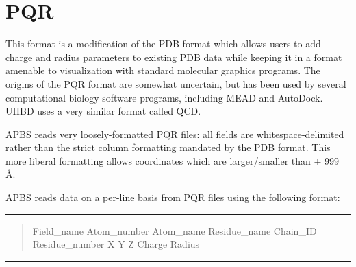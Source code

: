 \documentclass[letterpaper,10pt,english]{sphinxmanual}
\begin{document}
\section{PQR}
\label{documentation_pages/file_format:pqr}
This format is a modification of the PDB format which allows users to add charge
and radius parameters to existing PDB data while keeping it in a format amenable
to visualization with standard molecular graphics programs. The origins of the PQR
format are somewhat uncertain, but has been used by several computational biology
software programs, including MEAD and AutoDock. UHBD uses a very similar format
called QCD.

APBS reads very loosely-formatted PQR files: all fields are whitespace-delimited
rather than the strict column formatting mandated by the PDB format. This more
liberal formatting allows coordinates which are larger/smaller than \(\pm\) 999 Å.

APBS reads data on a per-line basis from PQR files using the following format:


\bigskip\hrule{}\bigskip

\begin{quote}

Field\_name Atom\_number Atom\_name Residue\_name Chain\_ID Residue\_number X Y Z Charge Radius
\end{quote}


\bigskip\hrule{}\bigskip
\end{document}
